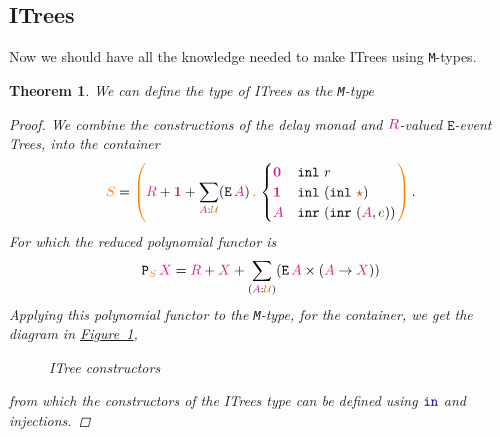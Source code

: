 \documentclass[twoside,11pt,openright]{report}
\theoremstyle{plain} %
\newtheorem{thm}{Theorem}[section]
\theoremstyle{definition}
\theoremstyle{remark}
\newcommand*{\figref}[1]{\hyperref[fig:#1]{Figure~\ref*{fig:#1}}}
\newcommand*{\term}[1]{\textcolor{green!30!black}{#1}} %
\newcommand*{\type}[1]{\textcolor{magenta!90!black}{#1}}
\newcommand*{\container}[1]{\textcolor{orange}{#1}}
\newcommand*{\containerpair}[2]{\ensuremath{\colorlet{savedleftcolor}{.}\color{orange}\left(\color{savedleftcolor}#1\,\textcolor{orange}{\mathbf{,}}\,#2\color{orange}\right)\color{savedleftcolor}}}
\newcommand*{\universe}[1]{\textcolor{orange!80!black}{#1}}
\newcommand*{\unit}{\type{\textbf{1}}}
\newcommand*{\empt}{\type{\textbf{0}}}
\newcommand*{\constant}[1]{\textcolor{orange!60!black}{\ensuremath{\mathtt{#1}}}}
\newcommand*{\function}[1]{\textcolor{blue!60!black}{\ensuremath{\mathtt{#1}}}}
\newcommand*{\constructor}[1]{\textcolor{purple!60!black}{\ensuremath{\mathtt{#1}}}}
\newcommand*{\typeformer}[1]{\ensuremath{\mathtt{#1}}}
\newcommand*{\functor}[1]{\ensuremath{\mathbf{\mathtt{#1}}}}
\newcommand*{\unitelem}{\constant{\star}} %
\begin{document}
\subsection{ITrees}
Now we should have all the knowledge needed to make ITrees using \texttt{M}-types.
\begin{thm}
  We can define the type of ITrees as the \texttt{M}-type
  \begin{proof}
    We combine the constructions of the delay monad and \(\type{R}\)-valued \(\typeformer{E}\)-event Trees, into the container
    \begin{equation}
      \container{S} = \containerpair{\type{R}+\unit+\sum_{\type{A}:\universe{\mathcal{U}}} (\typeformer{E}\,\type{A})}{\begin{cases} \empt & \texttt{inl}~r \\ \unit & \texttt{inl}~(\texttt{inl}~\unitelem) \\ \type{A} & \texttt{inr}~(\texttt{inr}~(\type{A},\term{e})) \end{cases}}.
    \end{equation}
    \noindent For which the reduced polynomial functor is
    \begin{equation}
      \functor{P}_{\container{S}}\,\type{X} = \type{R} + \type{X} + \sum_{(\type{A} : \universe{\mathcal{U}})} (\typeformer{E}\,\type{A} \times (\type{A} \rightarrow \type{X}))
    \end{equation}
    Applying this polynomial functor to the \texttt{M}-type, for the container, we get the diagram in \figref{ITree-constructors},
    \begin{figure}[h]
      \centering
      \caption{ITree constructors}
      \label{fig:ITree-constructors}
    \end{figure}
    from which the constructors of the ITrees type can be defined using \(\function{in}\) and injections.
  \end{proof}
\end{thm}
\end{document}
